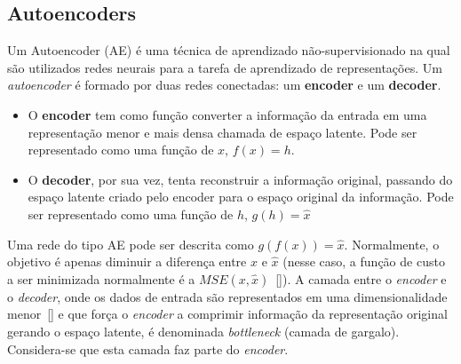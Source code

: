 \subsection{Autoencoders}
\label{ae_coding}
Um Autoencoder (\acrshort{AE}) é uma técnica de aprendizado não-supervisionado na qual são utilizados redes neurais para a tarefa de aprendizado de representações. Um \textit{autoencoder} é formado por duas redes conectadas: um \textbf{encoder} e um \textbf{decoder}.
\begin{itemize}
\item O \textbf{encoder} tem como função converter a informação da entrada em uma representação menor e mais densa chamada de espaço latente. Pode ser representado como uma função de $x$, $f(x) = h$.
\item O \textbf{decoder}, por sua vez, tenta reconstruir a informação original, passando do espaço latente criado pelo encoder para o espaço original da informação. Pode ser representado como uma função de $h$, $g(h) = \hat{x}$
\end{itemize} 
Uma rede do tipo \acrshort{AE} pode ser descrita como $g(f(x)) = \hat{x}$. Normalmente, o objetivo é apenas diminuir a diferença entre $x$ e $\hat{x}$ (nesse caso, a função de custo a ser minimizada normalmente é a $MSE(x, \hat{x})$~[]). A camada entre o \textit{encoder} e o \textit{decoder}, onde os dados de entrada são representados em uma dimensionalidade menor~[] e que força o \textit{encoder} a comprimir informação da representação original gerando o espaço latente, é denominada \textit{bottleneck} (camada de gargalo). Considera-se que esta camada faz parte do \textit{encoder}. 

